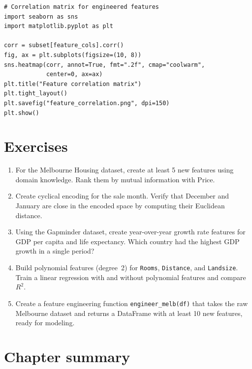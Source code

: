 \begin{verbatim}
# Correlation matrix for engineered features
import seaborn as sns
import matplotlib.pyplot as plt

corr = subset[feature_cols].corr()
fig, ax = plt.subplots(figsize=(10, 8))
sns.heatmap(corr, annot=True, fmt=".2f", cmap="coolwarm",
            center=0, ax=ax)
plt.title("Feature correlation matrix")
plt.tight_layout()
plt.savefig("feature_correlation.png", dpi=150)
plt.show()
\end{verbatim}

\section{Exercises}

\begin{exercise}
\begin{enumerate}
  \item For the Melbourne Housing dataset, create at least 5 new features using domain knowledge. Rank them by mutual information with Price.
  \item Create cyclical encoding for the sale month. Verify that December and January are close in the encoded space by computing their Euclidean distance.
  \item Using the Gapminder dataset, create year-over-year growth rate features for GDP per capita and life expectancy. Which country had the highest GDP growth in a single period?
  \item Build polynomial features (degree~2) for \texttt{Rooms}, \texttt{Distance}, and \texttt{Landsize}. Train a linear regression with and without polynomial features and compare $R^2$.
  \item Create a feature engineering function \texttt{engineer\_melb(df)} that takes the raw Melbourne dataset and returns a DataFrame with at least 10 new features, ready for modeling.
\end{enumerate}
\end{exercise}

\section{Chapter summary}

